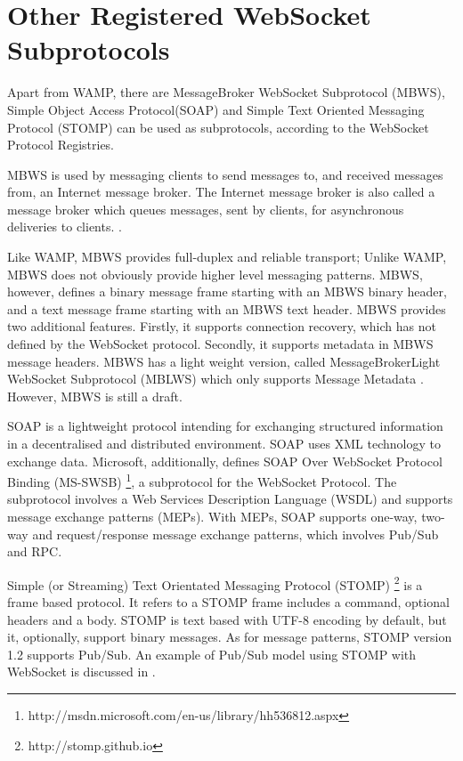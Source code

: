 \section{Other Registered WebSocket Subprotocols}

Apart from WAMP, there are MessageBroker WebSocket Subprotocol (MBWS), Simple Object Access Protocol(SOAP) and Simple Text Oriented Messaging Protocol (STOMP) can be used as subprotocols, according to the WebSocket Protocol Registries.

MBWS is used by messaging clients to send messages to, and received messages from, an Internet message broker. The Internet message broker is also called a message broker which queues messages, sent by clients, for asynchronous deliveries to clients. \cite{hapner2012messagebroker}. 

Like WAMP, MBWS provides full-duplex and reliable transport; Unlike WAMP, MBWS does not obviously provide higher level messaging patterns. MBWS, however, defines a binary message frame starting with an MBWS binary header, and a text message frame starting with an MBWS text header. MBWS provides two additional features. Firstly, it supports connection recovery, which has not defined by the WebSocket protocol. Secondly, it supports metadata in MBWS message headers. MBWS has a light weight version, called MessageBrokerLight WebSocket Subprotocol (MBLWS) which only supports Message Metadata \cite{hapner2012messagebroker}. However, MBWS is still a draft. 

SOAP is a lightweight protocol intending for exchanging structured information in a decentralised and distributed environment. SOAP uses XML technology to exchange data. \cite{gudginsoap} Microsoft, additionally, defines SOAP Over WebSocket Protocol Binding (MS-SWSB) \footnote{http://msdn.microsoft.com/en-us/library/hh536812.aspx}, a subprotocol for the WebSocket Protocol. The subprotocol involves a Web Services Description Language (WSDL) and supports message exchange patterns (MEPs). With MEPs, SOAP supports one-way, two-way and request/response message exchange patterns, which involves Pub/Sub and RPC.

Simple (or Streaming) Text Orientated Messaging Protocol (STOMP) \footnote{http://stomp.github.io} is a frame based protocol. It refers to a STOMP frame includes a command, optional headers and a body. STOMP is text based with UTF-8 encoding by default, but it, optionally, support binary messages. As for message patterns, STOMP version 1.2 supports Pub/Sub. An example of Pub/Sub model using STOMP with WebSocket is discussed in \cite{wang2012definitive}.

